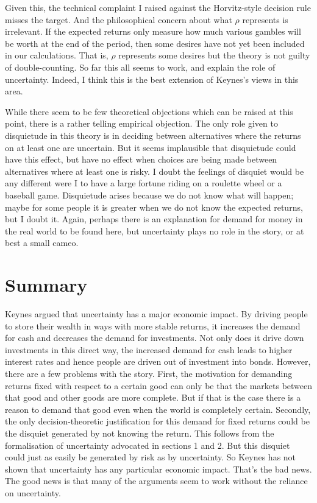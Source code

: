 \documentclass[
  10pt,
  letterpaper,
  DIV=11,
  numbers=noendperiod,
  twoside]{scrartcl}
\begin{document}
Given this, the technical complaint I raised against the Horvitz-style
decision rule misses the target. And the philosophical concern about
what \(\rho\) represents is irrelevant. If the expected returns only
measure how much various gambles will be worth at the end of the period,
then some desires have not yet been included in our calculations. That
is, \(\rho\) represents some desires but the theory is not guilty of
double-counting. So far this all seems to work, and explain the role of
uncertainty. Indeed, I think this is the best extension of Keynes's
views in this area.

While there seem to be few theoretical objections which can be raised at
this point, there is a rather telling empirical objection. The only role
given to disquietude in this theory is in deciding between alternatives
where the returns on at least one are uncertain. But it seems
implausible that disquietude could have this effect, but have no effect
when choices are being made between alternatives where at least one is
risky. I doubt the feelings of disquiet would be any different were I to
have a large fortune riding on a roulette wheel or a baseball game.
Disquietude arises because we do not know what will happen; maybe for
some people it is greater when we do not know the expected returns, but
I doubt it. Again, perhaps there is an explanation for demand for money
in the real world to be found here, but uncertainty plays no role in the
story, or at best a small cameo.

\section{Summary}\label{summary}

Keynes argued that uncertainty has a major economic impact. By driving
people to store their wealth in ways with more stable returns, it
increases the demand for cash and decreases the demand for investments.
Not only does it drive down investments in this direct way, the
increased demand for cash leads to higher interest rates and hence
people are driven out of investment into bonds. However, there are a few
problems with the story. First, the motivation for demanding returns
fixed with respect to a certain good can only be that the markets
between that good and other goods are more complete. But if that is the
case there is a reason to demand that good even when the world is
completely certain. Secondly, the only decision-theoretic justification
for this demand for fixed returns could be the disquiet generated by not
knowing the return. This follows from the formalisation of uncertainty
advocated in sections 1 and 2. But this disquiet could just as easily be
generated by risk as by uncertainty. So Keynes has not shown that
uncertainty has any particular economic impact. That's the bad news. The
good news is that many of the arguments seem to work without the
reliance on uncertainty.
\end{document}
